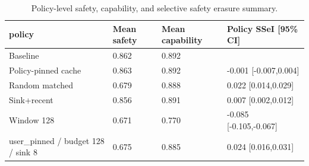 \begin{table}[t]
\centering
\begingroup
\small
\setlength{\tabcolsep}{3pt}
\renewcommand{\arraystretch}{0.94}
\begin{tabularx}{\linewidth}{@{}lXXX@{}}
\toprule
policy & Mean safety & Mean capability & Policy SSeI [95\% CI] \\
\midrule
Baseline & 0.862 & 0.892 &  \\
Policy-pinned cache & 0.863 & 0.892 & -0.001 [-0.007,0.004] \\
Random matched & 0.679 & 0.888 & 0.022 [0.014,0.029] \\
Sink+recent & 0.856 & 0.891 & 0.007 [0.002,0.012] \\
Window 128 & 0.671 & 0.770 & -0.085 [-0.105,-0.067] \\
user\_pinned / budget 128 / sink 8 & 0.675 & 0.885 & 0.024 [0.016,0.031] \\
\bottomrule
\end{tabularx}
\endgroup
\caption{Policy-level safety, capability, and selective safety erasure summary.}
\label{tab:main-results}
\end{table}
